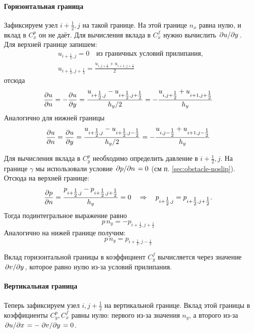 \paragraph{Горизонтальная граница} Зафиксируем узел $i+\tfrac12, j$ на такой границе.
На этой границе $n_x$ равна нулю, и вклад в $C^p_x$ он не даёт.
Для вычисления вклада в $C^f_x$ нужно вычислить $\left.\partial u\middle/\partial y\right.$.
Для верхней границе запишем:
\begin{align*}
&u_{i+\tfrac12, j} = 0 \quad \text{из граничных условий прилипания},\\
&u_{i+\tfrac12, j + \tfrac12} = \frac{u_{i, j+\tfrac12} + u_{i+1, j + \tfrac12}}{2}
\end{align*}
отсюда
\begin{equation*}
\frac{\partial u}{\partial n} =
-\frac{\partial u}{\partial y} = \frac{u_{i+\tfrac12, j} - u_{i+\tfrac12, j+\tfrac12}}{h_y/2} =
              -\frac{u_{i, j+\tfrac12} + u_{i+1, j + \tfrac12}}{h_y}
\end{equation*}
Аналогично для нижней границы
\begin{equation*}
\frac{\partial u}{\partial n} =
\frac{\partial u}{\partial y} =
\frac{u_{i+\tfrac12, j} - u_{i+\tfrac12, j-\tfrac12}}{h_y/2} =
-\frac{u_{i, j-\tfrac12} + u_{i+1, j - \tfrac12}}{h_y}
\end{equation*}

Для вычисления вклада в $C_y^p$ необходимо определить давление в $i+\tfrac12, j$.
На границе $\gamma$ мы использовали условие $\left.\partial p\middle/\partial n\right. = 0$ (см п. \ref{sec:obstacle-noslip}).
Отсюда на верхней границе:
\begin{equation*}
\frac{\partial p}{\partial n} = \frac{p_{i+\tfrac12, j} - p_{i+\tfrac12, j+\tfrac12}}{h_y} = 0
\quad\Rightarrow\quad p_{i+\tfrac12, j} = p_{i+\tfrac12, j+\tfrac12}.
\end{equation*}
Тогда подинтегральное выражение равно
\begin{equation*}
p\,n_y = -p_{i+\tfrac12, j+\tfrac12}
\end{equation*}
Аналогично на нижей границе получим:
\begin{equation*}
p\,n_y = p_{i+\tfrac12, j-\tfrac12}
\end{equation*}

Вклад горизонтальной границы в коэффициент $C^f_y$
вычисляется через значение $\left.\partial v\middle/\partial y\right.$, которое равно нулю из-за условий прилипания.

\paragraph{Вертикальная граница}
Теперь зафиксируем узел $i, j+\tfrac12$ на вертикальной границе.
Вклад этой границы в коэффициенты $C^p_y, C^f_x$ равны нулю:
первого из-за значения $n_y$, а второго из-за $\left.\partial u\middle/\partial x\right. = -\left.\partial v\middle/\partial y\right. = 0$.

